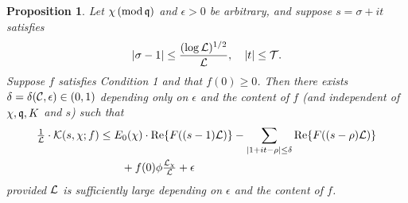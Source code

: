 \documentclass[12pt,psamsfonts]{amsart}
\newtheorem{prop}[thm]{Proposition}
\theoremstyle{definition}
\theoremstyle{remark}
\numberwithin{equation}{section}
\begin{document}
\begin{prop} \label{ExplicitNP} Let $\chi \, (\mathrm{mod} {\, \mathfrak{q}})$ and $\epsilon > 0$ be arbitrary, and suppose $s = \sigma + it$ satisfies
\[
|\sigma-1| \leq \frac{(\log \mathcal{L})^{1/2}}{\mathcal{L}}, \quad |t| \leq \mathcal{T}.
\]
 Suppose $f$ satisfies Condition 1 and that $f(0) \geq 0 $. Then there exists $\delta = \delta(\mathcal{C}, \epsilon) \in (0,1)$ depending only on $\epsilon$ and the content of $f$ (and independent of $\chi, \mathfrak{q}, K$ and $s$) such that 
 \begin{equation}
 \label{ExplicitNP1}
\begin{aligned}
\tfrac{1}{\mathcal{L}}\cdot \mathcal{K}(s,\chi; f) & \leq  E_0(\chi) \cdot \mathrm{Re}\{  F((s-1)\mathcal{L}) \}  - \sum_{|1+it-\rho| \leq \delta} \mathrm{Re}\{ F( (s-\rho) \mathcal{L}) \} \\
& \qquad + f(0)\phi \tfrac{\mathcal{L}_{\chi}}{\mathcal{L}}  + \epsilon
\end{aligned}
\end{equation}
provided $\mathcal{L}$ is sufficiently large depending on $\epsilon$ and the content of $f$. 
\end{prop}
%
\end{document}
